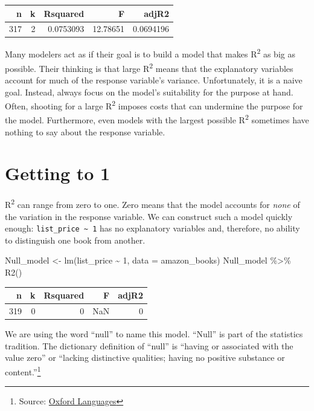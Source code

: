 \documentclass[
  letterpaper,
  DIV=11,
  numbers=noendperiod,
  oneside]{scrreprt}
\newenvironment{Shaded}{\begin{snugshade}}{\end{snugshade}}
\newcommand{\AttributeTok}[1]{\textcolor[rgb]{0.40,0.45,0.13}{#1}}
\newcommand{\DecValTok}[1]{\textcolor[rgb]{0.68,0.00,0.00}{#1}}
\newcommand{\FunctionTok}[1]{\textcolor[rgb]{0.28,0.35,0.67}{#1}}
\newcommand{\NormalTok}[1]{\textcolor[rgb]{0.00,0.23,0.31}{#1}}
\newcommand{\OtherTok}[1]{\textcolor[rgb]{0.00,0.23,0.31}{#1}}
\newcommand{\SpecialCharTok}[1]{\textcolor[rgb]{0.37,0.37,0.37}{#1}}
\begin{document}
\ttfamily 
\begin{tabular}{rrrrr}
\toprule
n & k & Rsquared & F & adjR2\\
\midrule
317 & 2 & 0.0753093 & 12.78651 & 0.0694196\\
\bottomrule
\end{tabular} \normalfont
\bigskip

Many modelers act as if their goal is to build a model that makes
R\textsuperscript{2} as big as possible. Their thinking is that large
R\textsuperscript{2} means that the explanatory variables account for
much of the response variable's variance. Unfortunately, it is a naive
goal. Instead, always focus on the model's suitability for the purpose
at hand. Often, shooting for a large R\textsuperscript{2} imposes costs
that can undermine the purpose for the model. Furthermore, even models
with the largest possible R\textsuperscript{2} sometimes have nothing to
say about the response variable.

\hypertarget{getting-to-1}{%
\section{Getting to 1}\label{getting-to-1}}

R\textsuperscript{2} can range from zero to one. Zero means that the
model accounts for \emph{none} of the variation in the response
variable. We can construct such a model quickly enough:
\texttt{list\_price\ \textasciitilde{}\ 1} has no explanatory variables
and, therefore, no ability to distinguish one book from another.

\begin{Shaded}
\begin{Highlighting}[]
\NormalTok{Null\_model }\OtherTok{\textless{}{-}} \FunctionTok{lm}\NormalTok{(list\_price }\SpecialCharTok{\textasciitilde{}} \DecValTok{1}\NormalTok{, }\AttributeTok{data =}\NormalTok{ amazon\_books)}
\NormalTok{Null\_model }\SpecialCharTok{\%\textgreater{}\%} \FunctionTok{R2}\NormalTok{()}
\end{Highlighting}
\end{Shaded}

\ttfamily 
\begin{tabular}{rrrrr}
\toprule
n & k & Rsquared & F & adjR2\\
\midrule
319 & 0 & 0 & NaN & 0\\
\bottomrule
\end{tabular} \normalfont
\bigskip

We are using the word ``null'' to name this model. ``Null'' is part of
the statistics tradition. The dictionary definition of ``null'' is
``having or associated with the value zero'' or ``lacking distinctive
qualities; having no positive substance or content.''\footnote{Source:
  \href{https://languages.oup.com/dictionaries/}{Oxford Languages}}
\end{document}
